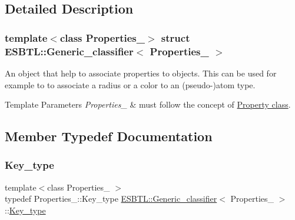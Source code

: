 \subsection{Detailed Description}
\subsubsection*{template$<$class Properties\+\_\+$>$\newline
struct E\+S\+B\+T\+L\+::\+Generic\+\_\+classifier$<$ Properties\+\_\+ $>$}

An object that help to associate properties to objects. This can be used for example to to associate a radius or a color to an (pseudo-\/)atom type. 
\begin{DoxyTemplParams}{Template Parameters}
{\em Properties\+\_\+} & must follow the concept of \hyperlink{group__prop__classif}{Property class}. \\
\hline
\end{DoxyTemplParams}


\subsection{Member Typedef Documentation}
\mbox{\label{structESBTL_1_1Generic__classifier_aa973891ce9d50ffc967a777a6fa67218}} 
\subsubsection{\texorpdfstring{Key\+\_\+type}{Key\_type}}
{\footnotesize\ttfamily template$<$class Properties\+\_\+ $>$ \\
typedef Properties\+\_\+\+::\+Key\+\_\+type \hyperlink{structESBTL_1_1Generic__classifier}{E\+S\+B\+T\+L\+::\+Generic\+\_\+classifier}$<$ Properties\+\_\+ $>$\+::\hyperlink{structESBTL_1_1Generic__classifier_aa973891ce9d50ffc967a777a6fa67218}{Key\+\_\+type}}

\mbox{\label{structESBTL_1_1Generic__classifier_aef70ade88efad6f1819bfd389b925ac9}} 
